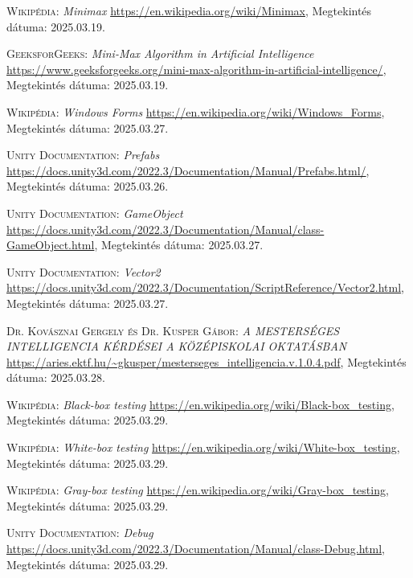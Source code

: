\documentclass[
]{thesis-ekf}
\theoremstyle{definition}
\theoremstyle{remark}
\begin{document}
\begin{thebibliography}{2}
\textsc{Wikipédia}: \emph{Minimax} 
\url{https://en.wikipedia.org/wiki/Minimax}, Megtekintés dátuma: 2025.03.19.

\textsc{GeeksforGeeks}: \emph{Mini-Max Algorithm in Artificial Intelligence} 
\url{https://www.geeksforgeeks.org/mini-max-algorithm-in-artificial-intelligence/}, Megtekintés dátuma: 2025.03.19.

\textsc{Wikipédia}: \emph{Windows Forms} 
\url{https://en.wikipedia.org/wiki/Windows_Forms}, Megtekintés dátuma: 2025.03.27.

\textsc{Unity Documentation}: \emph{Prefabs} 
\url{https://docs.unity3d.com/2022.3/Documentation/Manual/Prefabs.html/}, Megtekintés dátuma: 2025.03.26.

\textsc{Unity Documentation}: \emph{GameObject} 
\url{https://docs.unity3d.com/2022.3/Documentation/Manual/class-GameObject.html}, Megtekintés dátuma: 2025.03.27.

\textsc{Unity Documentation}: \emph{Vector2} 
\url{https://docs.unity3d.com/2022.3/Documentation/ScriptReference/Vector2.html}, Megtekintés dátuma: 2025.03.27.

\textsc{Dr. Kovásznai Gergely és Dr. Kusper Gábor}: \emph{A MESTERSÉGES INTELLIGENCIA KÉRDÉSEI A KÖZÉPISKOLAI OKTATÁSBAN} 
\url{https://aries.ektf.hu/~gkusper/mesterseges_intelligencia.v.1.0.4.pdf}, Megtekintés dátuma: 2025.03.28.

\textsc{Wikipédia}: \emph{Black-box testing} 
\url{https://en.wikipedia.org/wiki/Black-box_testing}, Megtekintés dátuma: 2025.03.29.

\textsc{Wikipédia}: \emph{White-box testing} 
\url{https://en.wikipedia.org/wiki/White-box_testing}, Megtekintés dátuma: 2025.03.29.

\textsc{Wikipédia}: \emph{Gray-box testing} 
\url{https://en.wikipedia.org/wiki/Gray-box_testing}, Megtekintés dátuma: 2025.03.29.

\textsc{Unity Documentation}: \emph{Debug} 
\url{https://docs.unity3d.com/2022.3/Documentation/Manual/class-Debug.html}, Megtekintés dátuma: 2025.03.29.


\end{thebibliography}


\end{document}
